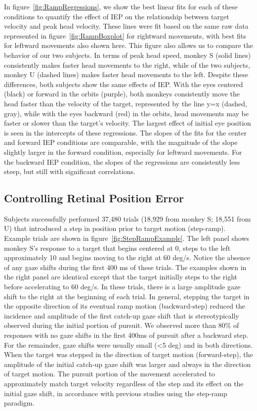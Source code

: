 \documentclass[12pt]{article}
\begin{document}
In figure~\ref{fig:RampRegressions}, we show the best linear fits for each of these conditions to quantify the effect of IEP on the relationship between target velocity and peak head velocity. These lines were fit based on the same raw data represented in figure~\ref{fig:RampBoxplot} for rightward movements, with best fits for leftward movements also shown here. This figure also allows us to compare the behavior of our two subjects. In terms of peak head speed, monkey S (solid lines) consistently makes faster head movements to the right, while of the two subjects, monkey U (dashed lines) makes faster head movements to the left. Despite these differences, both subjects show the same effects of IEP. With the eyes centered (black) or forward in the orbits (purple), both monkeys consistently move the head faster than the velocity of the target, represented by the line y=x (dashed, gray), while with the eyes backward (red) in the orbits, head movements may be faster or slower than the target’s velocity. The largest effect of initial eye position is seen in the intercepts of these regressions. The slopes of the fits for the center and forward IEP conditions are comparable, with the magnitude of the slope slightly larger in the forward condition, especially for leftward movements. For the backward IEP condition, the slopes of the regressions are consistently less steep, but still with significant correlations.

\subsection{Controlling Retinal Position Error}
Subjects successfully performed 37,480 trials (18,929 from monkey S; 18,551 from U) that introduced a step in position prior to target motion (step-ramp). Example trials are shown in figure~\ref{fig:StepRampExample}. The left panel shows monkey S’s response to a target that begins centered at 0\textdegree{}, steps to the left approximately 10\textdegree{} and begins moving to the right at 60 deg/s. Notice the absence of any gaze shifts during the first 400 ms of these trials. The examples shown in the right panel are identical except that the target initially steps to the right before accelerating to 60 deg/s. In these trials, there is a large amplitude gaze shift to the right at the beginning of each trial. In general, stepping the target in the opposite direction of its eventual ramp motion (backward-step) reduced the incidence and amplitude of the first catch-up gaze shift that is stereotypically observed during the initial portion of pursuit. We observed more than 80\% of responses with no gaze shifts in the first 400ms of pursuit after a backward step. For the remainder, gaze shifts were usually small (<5 deg) and in both directions. When the target was stepped in the direction of target motion (forward-step), the amplitude of the initial catch-up gaze shift was larger and always in the direction of target motion. The pursuit portion of the movement accelerated to approximately match target velocity regardless of the step and its effect on the initial gaze shift, in accordance with previous studies using the step-ramp paradigm. 
\end{document}
